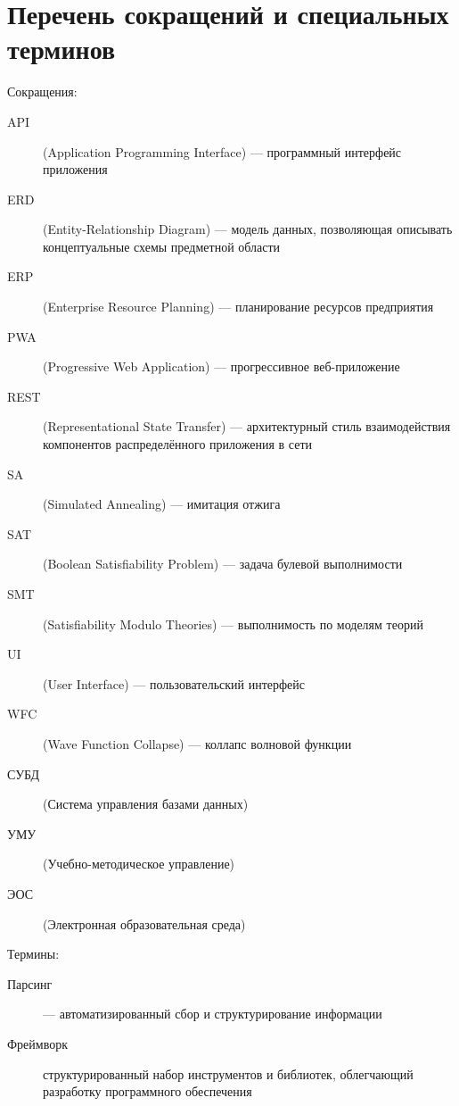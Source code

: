 
\section*{Перечень сокращений и специальных терминов}


Сокращения:

\begin{description}
	\item[API] (Application Programming Interface) --- программный интерфейс приложения
	\item[ERD] (Entity-Relationship Diagram) --- модель данных, позволяющая описывать концептуальные схемы предметной области
	\item[ERP] (Enterprise Resource Planning) --- планирование ресурсов предприятия
	\item[PWA] (Progressive Web Application) --- прогрессивное веб-приложение
	\item[REST] (Representational State Transfer) --- архитектурный стиль взаимодействия компонентов распределённого приложения в сети
	\item[SA] (Simulated Annealing) --- имитация отжига
	\item[SAT] (Boolean Satisfiability Problem) --- задача булевой выполнимости
	\item[SMT] (Satisfiability Modulo Theories) --- выполнимость по моделям теорий
	\item[UI] (User Interface) --- пользовательский интерфейс
	\item[WFC] (Wave Function Collapse) --- коллапс волновой функции
	\item[СУБД] (Система управления базами данных)
	\item[УМУ] (Учебно-методическое управление)
	\item[ЭОС] (Электронная образовательная среда)
\end{description}

Термины:

\begin{description}
	\item[Парсинг] --- автоматизированный сбор и структурирование информации
	\item[Фреймворк] структурированный набор инструментов и библиотек, облегчающий разработку программного обеспечения
\end{description}

